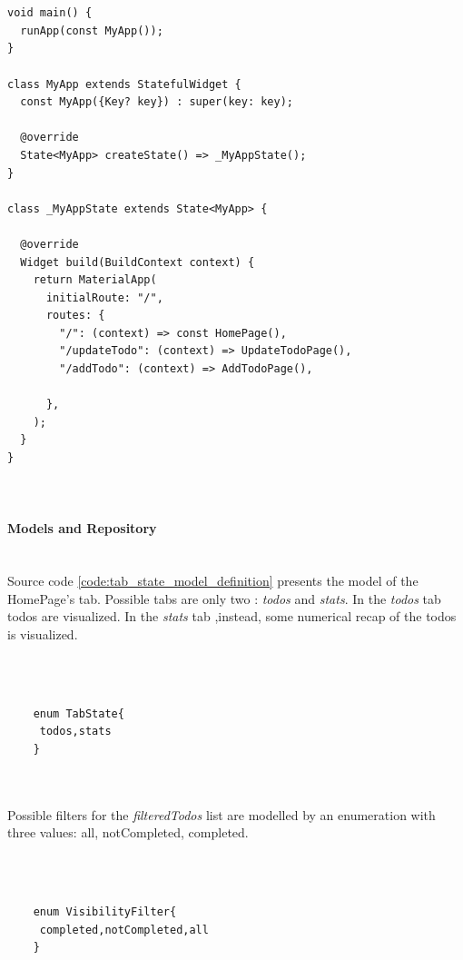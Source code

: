		\mbox{}\\
		 \mbox{}
	\begin{verbatim}
	
void main() {
  runApp(const MyApp());
}

class MyApp extends StatefulWidget {
  const MyApp({Key? key}) : super(key: key);

  @override
  State<MyApp> createState() => _MyAppState();
}

class _MyAppState extends State<MyApp> {

  @override
  Widget build(BuildContext context) {
    return MaterialApp(
      initialRoute: "/",
      routes: {
        "/": (context) => const HomePage(),
        "/updateTodo": (context) => UpdateTodoPage(),
        "/addTodo": (context) => AddTodoPage(),

      },
    );
  }
}

	
	\end{verbatim}
	\paragraph{Models and Repository} \mbox{} \\
	\label{par:models_and_repository_todo_app}
Source code \ref{code:tab_state_model_definition} presents the model of the HomePage's tab. Possible tabs are only two : \textit{todos} and \textit{stats}. In the \textit{todos} tab todos are visualized. In the \textit{stats} tab ,instead, some numerical recap of the todos is visualized.

	\mbox{}\\
	
	
	 \mbox{}
	\begin{verbatim}
	
	enum TabState{
	 todos,stats
	}
	
	
	\end{verbatim}
	
	\mbox{}
	
Possible filters for the \textit{filteredTodos} list are modelled by an enumeration with three values: all, notCompleted, completed.
	
	\mbox{}\\
	
	 \mbox{}
	\begin{verbatim}
	
	enum VisibilityFilter{
	 completed,notCompleted,all
	}
	
	
	\end{verbatim}
	
